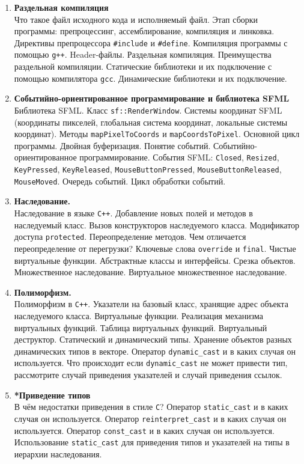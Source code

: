 \documentclass{article}
\begin{document}
\begin{enumerate}
\item \textbf{Раздельная компиляция}\\
Что такое файл исходного кода и исполняемый файл. Этап сборки программы: препроцессинг, ассемблирование, компиляция и линковка. Директивы препроцессора \texttt{\#include} и \texttt{\#define}. Компиляция программы с помощью \texttt{g++}. Header-файлы. Раздельная компиляция. Преимущества раздельной компиляции. Статические библиотеки и их подключение с помощью компилятора \texttt{gcc}. Динамические библиотеки и их подключение.

\item \textbf{Событийно-ориентированное программирование и библиотека SFML}\\
Библиотека SFML. Класс \texttt{sf::RenderWindow}. Системы координат SFML (координаты пикселей, глобальная система координат, локальные системы координат). Методы \texttt{mapPixelToCoords} и \texttt{mapCoordsToPixel}. Основной цикл программы. Двойная буферизация. Понятие событий. Событийно-ориентированное программирование. События SFML: \texttt{Closed}, \texttt{Resized}, \texttt{KeyPressed}, \texttt{KeyReleased}, \texttt{MouseButtonPressed},  \texttt{MouseButtonReleased}, \texttt{MouseMoved}. Очередь событий. Цикл обработки событий.


\item \textbf{Наследование.}\\
Наследование в языке \texttt{C++}. Добавление новых полей и методов в наследуемый класс. Вызов конструкторов наследуемого класса. Модификатор доступа \texttt{protected}. Переопределение методов. Чем отличается переопределение от перегрузки? Ключевые слова \texttt{override} и \texttt{final}. Чистые виртуальные функции. Абстрактные классы и интерфейсы.  Срезка объектов. Множественное наследование. Виртуальное множественное наследование.

\item \textbf{Полиморфизм.}\\
Полиморфизм в \texttt{C++}. Указатели на базовый класс, хранящие адрес объекта наследуемого класса.  Виртуальные функции. Реализация механизма виртуальных функций. Таблица виртуальных функций. Виртуальный деструктор. Статический и динамический типы. Хранение объектов разных динамических типов в векторе. Оператор \texttt{dynamic\_cast} и в каких случая он используется. Что происходит если \texttt{dynamic\_cast} не может привести тип, рассмотрите случай приведения указателей и случай приведения ссылок.

\item \textbf{*Приведение типов}\\
В чём недостатки приведения в стиле \texttt{C}? Оператор \texttt{static\_cast} и в каких случая он используется. Оператор \texttt{reinterpret\_cast} и в каких случая он используется. Оператор \texttt{const\_cast} и в каких случая он используется.  Использование \texttt{static\_cast} для приведения типов и указателей на типы в иерархии наследования. 




\end{enumerate}
\end{document}
